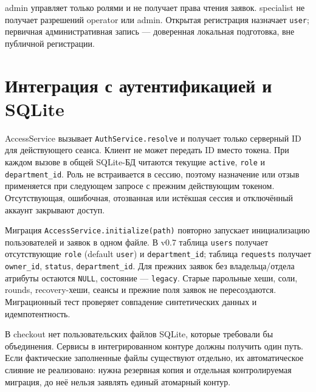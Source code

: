 \documentclass[12pt,a4paper]{article}
\begin{document}
admin управляет только ролями и не получает права чтения заявок. specialist не получает разрешений operator или admin. Открытая регистрация назначает \texttt{user}; первичная административная запись — доверенная локальная подготовка, вне публичной регистрации.

\section{Интеграция с аутентификацией и SQLite}
AccessService вызывает \texttt{AuthService.resolve} и получает только серверный ID для действующего сеанса. Клиент не может передать ID вместо токена. При каждом вызове в общей SQLite-БД читаются текущие \texttt{active}, \texttt{role} и \texttt{department\_id}. Роль не встраивается в сессию, поэтому назначение или отзыв применяется при следующем запросе с прежним действующим токеном. Отсутствующая, ошибочная, отозванная или истёкшая сессия и отключённый аккаунт закрывают доступ.

Миграция \texttt{AccessService.initialize(path)} повторно запускает инициализацию пользователей и заявок в одном файле. В v0.7 таблица \texttt{users} получает отсутствующие \texttt{role} (default \texttt{user}) и \texttt{department\_id}; таблица \texttt{requests} получает \texttt{owner\_id}, \texttt{status}, \texttt{department\_id}. Для прежних заявок без владельца/отдела атрибуты остаются \texttt{NULL}, состояние — \texttt{legacy}. Старые парольные хеши, соли, rounds, recovery-хеши, сеансы и прежние поля заявок не пересоздаются. Миграционный тест проверяет совпадение синтетических данных и идемпотентность.

В checkout нет пользовательских файлов SQLite, которые требовали бы объединения. Сервисы в интегрированном контуре должны получить один путь. Если фактические заполненные файлы существуют отдельно, их автоматическое слияние не реализовано: нужна резервная копия и отдельная контролируемая миграция, до неё нельзя заявлять единый атомарный контур.
\end{document}
